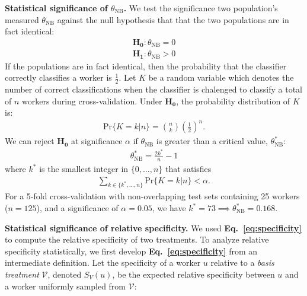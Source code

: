 \documentclass[a4paper]{report}
\begin{document}
\textbf{Statistical significance of $\theta_\text{NB}$.}
We test the significance two population's measured $\theta_\text{NB}$ against 
the null hypothesis that that the two populations are in fact identical:
\begin{align}
	\mathbf{H_0}: \theta_\text{NB} = 0 \\
	\mathbf{H_1}: \theta_\text{NB} > 0
\end{align}
If the populations are in fact identical, then the probability that the 
classifier correctly classifies a worker is $\frac{1}{2}$. Let $K$ be a random
variable which denotes the number of correct classifications when the 
classifier is chalenged to classify a total of $n$ workers during 
cross-validation.  Under $\mathbf{H_0}$, the probability distribution of $K$ 
is:
\begin{align}
	\text{Pr}\{K = k | n \} = { n \choose k } \left(\frac{1}{2}\right)^n.
\end{align}
We can reject $\mathbf{H_0}$ at significance $\alpha$ if $\theta_\text{NB}$ 
is greater than a critical value, $\theta_\text{NB}^*$:
\begin{align}
	\theta^*_\text{NB} = \frac{2k^*}{n} - 1
\end{align}
where $k^*$ is the smallest integer in $\{0,\dots,n\}$ that satisfies 
\begin{align}
	\sum_{k \in \{k^*, \dots, n\}} \text{Pr}\{K = k | n \} < \alpha.
\end{align}
For a 5-fold cross-validation with non-overlapping test sets containing 25 
workers ($n = 125$), and a significance of $\alpha = 0.05$, we
have $k^*=73 \implies \theta_\text{NB}^* = 0.168$.






\textbf{Statistical significance of relative specificity.}
We used \textbf{Eq.~\ref{eq:specificity}} to compute the relative specificity
of two treatments.  To analyze relative specificity statistically,
we first develop \textbf{Eq.~\ref{eq:specificity}} from an intermediate 
definition.  Let the specificity of a worker $u$ relative to a 
\textit{basis treatment} $\mathcal{V}$, denoted $S_V(u)$, be the expected 
relative specificity between $u$ and a worker uniformly sampled from 
$\mathcal{V}$:
\end{document}
